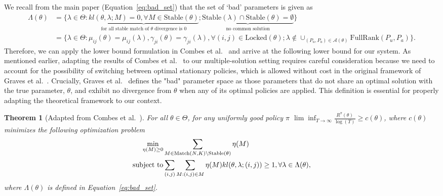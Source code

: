 \documentclass{article}
\newtheorem{theorem}{Theorem}[section]
\begin{document}
We recall from the main paper (Equation~\eqref{eq:bad_set}) that the set of `bad' parameters is given as 
\begin{align*}
    \Lambda(\theta) &= \{\lambda \in \Theta: \underbrace{ kl(\theta, \lambda; M) = 0, \forall M \in \mathrm{Stable}(\theta)}_{\text{for all stable match of $\theta$ divergence is $0$}}; \underbrace{\mathrm{Stable}(\lambda) \cap \mathrm{Stable}(\theta) = \emptyset}_{\text{no common solution}}\}\\
    & = \{\lambda \in \Theta: \mu_{ij}(\theta) = \mu_{ij}(\lambda), \gamma_{ji}(\theta) = \gamma_{ji}(\lambda),\forall (i,j) \in \mathrm{Locked}(\theta); \lambda \notin \cup_{(P_u, P_a) \in \mathcal{A}(\theta)}\mathrm{FullRank}(P_u, P_a) \}.
\end{align*}
Therefore, we can apply the lower bound formulation in Combes et al.~\cite{combes2015combinatorial} and arrive at the following lower bound for our system. As mentioned earlier, adapting the results of Combes et al.~\cite{combes2015combinatorial} to our multiple-solution setting requires careful consideration because we need to account for the possibility of switching between optimal stationary policies, which is allowed without cost in the original framework of Graves et al.~\cite{graves1997asymptotically}.  Crucially, Graves et al.~\cite{graves1997asymptotically} defines the "bad" parameter space as those parameters that do not share an optimal solution with the true parameter, $\theta$, and exhibit no divergence from $\theta$ when any of its optimal policies are applied. This definition is essential for properly adapting the theoretical framework to our context.
\begin{theorem}[Adapted from Combes et al.~\cite{combes2015combinatorial}]\label{thm:centralized_lower_combes}
For all $\theta \in \Theta$, for any {\em uniformly good} policy $\pi$
$\lim\inf_{T\to \infty} \frac{R^{\pi}(\theta)}{\log(T)} \geq c(\theta)$, where $c(\theta)$ minimizes the following optimization problem 
\begin{align}
    \min_{\eta(M) \geq 0} \notag
    &\sum_{M \in \mathrm{Match}(N,K)\setminus \mathrm{Stable}(\theta)}\eta(M)\\
    \text{subject to} &\sum_{(i, j)}\sum_{M: (i,j) \in M}\eta(M) kl(\theta, \lambda; (i,j))  \geq 1, \forall \lambda \in \Lambda(\theta),\label{eq:primal}
\end{align}
where 
$\Lambda(\theta)$ is defined in Equation~\eqref{eq:bad_set}. 
\end{theorem}  
\end{document}
